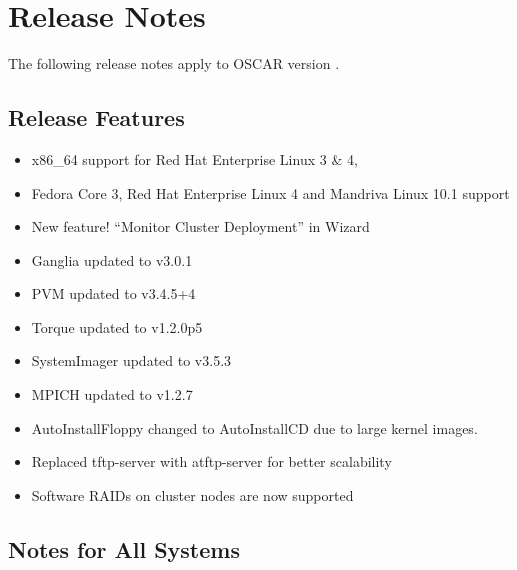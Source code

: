 %
%
%


\section{Release Notes}
\label{sec:release-notes}

The following release notes apply to OSCAR version \oscarversion.
\subsection{Release Features}
\label{subsec:release-features}

\begin{itemize}

\item x86\_64 support for Red Hat Enterprise Linux 3 \& 4,
\item Fedora Core 3, Red Hat Enterprise Linux 4 and 
      Mandriva Linux 10.1 support
\item New feature! ``Monitor Cluster Deployment'' in Wizard
\item Ganglia updated to v3.0.1
\item PVM updated to v3.4.5+4
\item Torque updated to v1.2.0p5
\item SystemImager updated to v3.5.3
\item MPICH updated to v1.2.7
\item AutoInstallFloppy changed to AutoInstallCD due to large kernel images.
\item Replaced tftp-server with atftp-server for better scalability
\item Software RAIDs on cluster nodes are now supported

\end{itemize}

\subsection{Notes for All Systems}
\label{subsec:release-notes}

